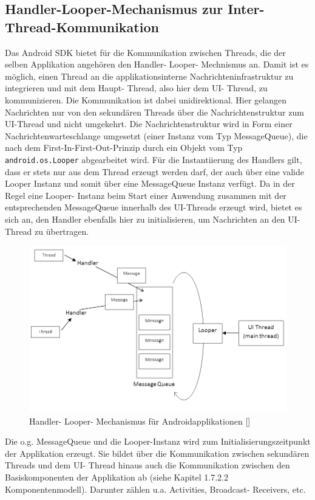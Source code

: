 \documentclass[12pt,oneside,a4paper,bibtotoc,liststotoc]{scrreprt}
\begin{document}
\subsection{Handler-Looper-Mechanismus zur Inter-Thread-Kommunikation}
Das Android SDK bietet für die Kommunikation zwischen Threads, die der selben Applikation angehören den Handler- Looper- Mechnismus an. Damit ist es möglich, einen Thread an die applikationsinterne Nachrichteninfrastruktur zu integrieren und mit dem Haupt- Thread, also hier dem UI- Thread, zu kommunizieren. Die Kommunikation ist dabei unidirektional. Hier gelangen Nachrichten nur von den sekundären Threads über die Nachrichtenstruktur zum UI-Thread und nicht umgekehrt. Die Nachrichtenstruktur wird in Form einer Nachrichtenwarteschlange umgesetzt (einer Instanz vom Typ MessageQueue), die nach dem First-In-First-Out-Prinzip durch ein Objekt vom Typ \texttt{android.os.Looper} abgearbeitet wird. Für die Instantiierung des Handlers gilt, dass er stets nur aus dem Thread erzeugt werden darf, der auch über eine valide Looper Instanz und somit über eine MessageQueue Instanz verfügt. Da in der Regel eine Looper- Instanz beim Start einer Anwendung zusammen mit der entsprechenden MessageQueue innerhalb des UI-Threads erzeugt wird, bietet es sich an, den Handler ebenfalls hier zu initialisieren, um Nachrichten an den UI-Thread zu übertragen.
\begin{figure}[H]
  \begin{centering}
    \includegraphics[width=1\textwidth]{img/handler_looper.png}
    \caption{Handler- Looper- Mechanismus für Androidapplikationen [\citet{handlerLooperBlock}]}
    \label{handler_looper}
  \end{centering}
\end{figure}
Die o.g. MessageQueue und die Looper-Instanz wird zum Initialisierungszeitpunkt der Applikation erzeugt. Sie bildet über die Kommunikation zwischen sekundären Threads und dem UI- Thread hinaus auch die Kommunikation zwischen den Basiskomponenten der Applikation ab (siehe Kapitel 1.7.2.2 Komponentenmodell). Darunter zählen u.a. Activities, Broadcast- Receivers, etc.
\end{document}
